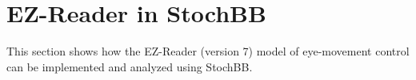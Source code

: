 \section{EZ-Reader in StochBB}
This section shows how the EZ-Reader (version 7) model of eye-movement control can be implemented and analyzed 
using StochBB.
